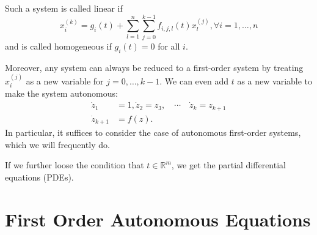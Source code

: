 \documentclass[../main.tex]{subfiles}
\begin{document}
Such a system is called linear if
\begin{equation*}
  x_i^{(k)} = g_i(t) + \sum_{l=1}^n \sum_{j=0}^{k-1} f_{i,j,l}(t) x_l^{(j)}, \forall i = 1, \dots, n
\end{equation*}
and is called homogeneous if $g_i(t) = 0$ for all $i$.

Moreover, any system can always be reduced to a ﬁrst-order system by treating $x_i^{(j)}$ as a new variable for $j = 0, \dots, k-1$. We can even add $t$ as a new variable to make the system autonomous:
\begin{equation*}
  \begin{aligned}
    \dot{z}_1 &= 1, \dot{z}_2 = z_3, \quad \cdots \quad \dot{z}_k = z_{k+1} \\
    \dot{z}_{k+1} &= f(z).
  \end{aligned}
\end{equation*}
In particular, it suﬃces to consider the case of autonomous ﬁrst-order systems, which we will frequently do.

If we further loose the condition that $t\in \mathbb{R}^m$, we get the partial differential equations (PDEs).

\section{First Order Autonomous Equations}
\end{document}
